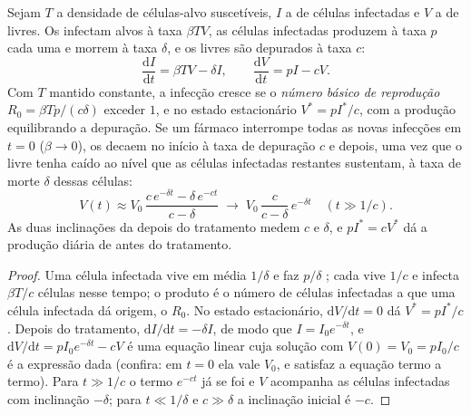 \begin{theorem}\label{thm:b3:virology:dynamics}
Sejam $T$ a densidade de células-alvo suscetíveis, $I$ a de células
infectadas e $V$ a de  livres. Os  infectam alvos à taxa
$\beta TV$, as células infectadas produzem  à taxa $p$ cada uma
e morrem à taxa $\delta$, e os  livres são depurados à taxa $c$:
\[
\frac{\mathrm{d}I}{\mathrm{d}t} = \beta TV - \delta I, \qquad
\frac{\mathrm{d}V}{\mathrm{d}t} = pI - cV .
\]
Com $T$ mantido constante, a infecção cresce se o \emph{número básico de
reprodução} $R_{0} = \beta Tp/(c\delta)$ exceder $1$, e no estado
estacionário $V^{*} = p I^{*}/c$, com a produção equilibrando a
depuração. Se um fármaco interrompe todas as novas infecções em $t = 0$
($\beta \to 0$), os  decaem no início à taxa de depuração $c$ e
depois, uma vez que o  livre tenha caído ao nível que as células
infectadas restantes sustentam, à taxa de morte $\delta$ dessas
células:
\[
V(t) \approx V_{0}\,\frac{c\,e^{-\delta t} - \delta\,e^{-ct}}{c - \delta}
\;\longrightarrow\; V_{0}\,\frac{c}{c-\delta}\,e^{-\delta t}
\quad (t \gg 1/c).
\]
As duas inclinações da  depois do tratamento medem $c$ e
$\delta$, e $pI^{*} = cV^{*}$ dá a produção diária de  antes do
tratamento.
\end{theorem}
\begin{proof}
Uma célula infectada vive em média $1/\delta$ e faz $p/\delta$ ;
cada  vive $1/c$ e infecta $\beta T/c$ células nesse tempo; o
produto é o número de células infectadas a que uma célula infectada dá
origem, o $R_{0}$. No estado estacionário,
$\mathrm{d}V/\mathrm{d}t = 0$ dá $V^{*} = pI^{*}/c$. Depois do
tratamento, $\mathrm{d}I/\mathrm{d}t =
-\delta I$, de modo que
$I = I_{0}e^{-\delta t}$, e $\mathrm{d}V/\mathrm{d}t =
pI_{0}e^{-\delta t} - cV$ é uma equação linear cuja solução com
$V(0) = V_{0} = pI_{0}/c$ é a expressão dada (confira: em $t = 0$ ela
vale $V_{0}$, e satisfaz a equação termo a termo). Para
$t
\gg 1/c$ o termo $e^{-ct}$ já se foi e $V$ acompanha as células
infectadas com inclinação $-\delta$; para $t \ll 1/\delta$ e
$c \gg \delta$ a inclinação inicial é $-c$.
\end{proof}

